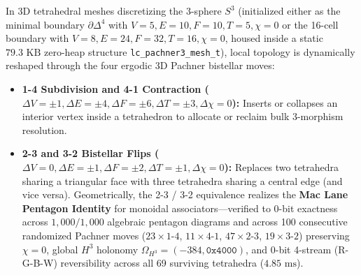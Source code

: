\documentclass[11pt, a4paper]{article}
\begin{document}
In 3D tetrahedral meshes discretizing the 3-sphere $S^3$ (initialized either as the minimal boundary $\partial\Delta^4$ with $V=5, E=10, F=10, T=5, \chi=0$ or the 16-cell boundary with $V=8, E=24, F=32, T=16, \chi=0$, housed inside a static $79.3\text{ KB}$ zero-heap structure \texttt{lc\_pachner3\_mesh\_t}), local topology is dynamically reshaped through the four ergodic 3D Pachner bistellar moves:
\begin{itemize}
    \item \textbf{1-4 Subdivision and 4-1 Contraction ($\Delta V = \pm 1, \Delta E = \pm 4, \Delta F = \pm 6, \Delta T = \pm 3, \Delta\chi = 0$):} Inserts or collapses an interior vertex inside a tetrahedron to allocate or reclaim bulk 3-morphism resolution.
    \item \textbf{2-3 and 3-2 Bistellar Flips ($\Delta V = 0, \Delta E = \pm 1, \Delta F = \pm 2, \Delta T = \pm 1, \Delta\chi = 0$):} Replaces two tetrahedra sharing a triangular face with three tetrahedra sharing a central edge (and vice versa). Geometrically, the 2-3 / 3-2 equivalence realizes the \textbf{Mac Lane Pentagon Identity} for monoidal associators---verified to 0-bit exactness across $1,000/1,000$ algebraic pentagon diagrams and across 100 consecutive randomized Pachner moves ($23 \times \text{1-4}$, $11 \times \text{4-1}$, $47 \times \text{2-3}$, $19 \times \text{3-2}$) preserving $\chi = 0$, global $H^3$ holonomy $\Omega_{H^3} = (-384, \texttt{0x4000})$, and 0-bit 4-stream (R-G-B-W) reversibility across all 69 surviving tetrahedra ($4.85\text{ ms}$).
\end{itemize}
\end{document}
